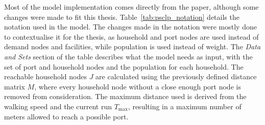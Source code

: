 \documentclass[12pt]{article}
\begin{document}
Most of the model implementation comes directly from the \textcite{psclp} paper, although some changes were made to fit this thesis. Table~\ref{tab:psclp_notation} details the notation used in the model. The changes made in the notation were mostly done to contextualise it for the thesis, as household and port nodes are used instead of demand nodes and facilities, while population is used instead of weight. The \textit{Data and Sets} section of the table describes what the model needs as input, with the set of port and household nodes and the population for each household. The reachable household nodes \(J\) are calculated using the previously defined distance matrix \(M\), where every household node without a close enough port node is removed from consideration. The maximum distance used is derived from the walking speed and the current run \(T_{\max}\), resulting in a maximum number of meters allowed to reach a possible port.
\end{document}

